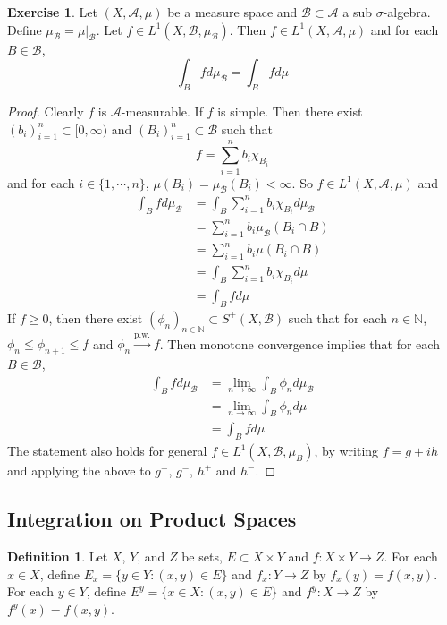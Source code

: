 \documentclass[12pt]{amsart}
\theoremstyle{definition}
\newtheorem{defn}[definition]{Definition}
\newtheorem{ex}[definition]{Exercise}
\newcommand{\sig}{\sigma}
\newcommand{\N}{\mathbb{N}}
\newcommand{\MA}{\mathcal{A}}
\newcommand{\MB}{\mathcal{B}}
\newcommand{\Rg}{[0,\infty)}
\newcommand{\limn}{\lim \limits_{n \rightarrow \infty}}
\newcommand{\convt}[1]{\xrightarrow{\text{#1}}}
\begin{document}
	\begin{ex}
	Let $(X, \MA, \mu)$ be a measure space and $\MB \subset \MA$ a sub $\sig$-algebra. Define $\mu_{\MB} = \mu|_{\MB}$. Let $f \in L^1(X, \MB, \mu_{\MB})$. Then $f \in L^1(X, \MA, \mu)$ and for each $B \in \MB$, $$\int_B f d \mu_{\MB} = \int_B f d \mu$$
	\end{ex}
	
	\begin{proof}
	Clearly $f$ is $\MA$-measurable. If $f$ is simple. Then there exist $(b_i)_{i=1}^n \subset \Rg$ and $(B_i)_{i=1}^n \subset \MB$ such that $$f = \sum_{i=1}^n b_i \chi_{B_i}$$ and for each $i \in \{1, \cdots, n\}$, $\mu(B_i) = \mu_{\MB}(B_i) < \infty$. So $f \in L^1(X, \MA, \mu)$ and 
	\begin{align*}
	\int_B f d \mu_{\MB} 
	&= \int_B \sum_{i=1}^n b_i \chi_{B_i} d\mu_{\MB} \\
	&= \sum_{i=1}^n b_i \mu_{\MB}(B_i \cap B)\\
	&= \sum_{i=1}^n b_i \mu(B_i \cap B)\\
	&= \int_B \sum_{i=1}^n b_i\chi_{B_i} d \mu \\
	&= \int_B f d \mu
	\end{align*}
	If $f \geq 0$, then there exist $(\phi_n)_{n \in \N} \subset S^+(X, \MB)$ such that for each $n \in \N$, $\phi_n \leq \phi_{n+1} \leq f$ and $\phi_n \convt{p.w.} f$. Then monotone convergence implies that for each $B \in \MB$,
	\begin{align*}
	\int_B f d\mu_{\MB} 
	&= \limn \int_B \phi_n d\mu_{\MB} \\
	&= \limn \int_B \phi_n d \mu \\
	&= \int_B f d\mu
	\end{align*}
	The statement also holds for general $f \in L^1(X, \MB, \mu_B)$, by writing $f = g+ih$ and applying the above to $g^+$, $g^-$, $h^+$ and $h^-$.
	\end{proof}
	
	\subsection{Integration on Product Spaces}
	
	\begin{defn}
		Let $X$, $Y$, and $Z$ be sets, $E \subset X \times Y$ and $f :X \times Y \rightarrow Z$. For each $x \in X$, define $E_x = \{y \in Y: (x,y) \in E\}$ and $f_x:Y \rightarrow Z$ by $f_x(y) = f(x,y)$. For each $y \in Y$, define $E^y = \{x \in X: (x,y) \in E\}$ and $f^y:X \rightarrow Z$ by $f^y(x) = f(x,y)$. 
	\end{defn}
	
\end{document}

